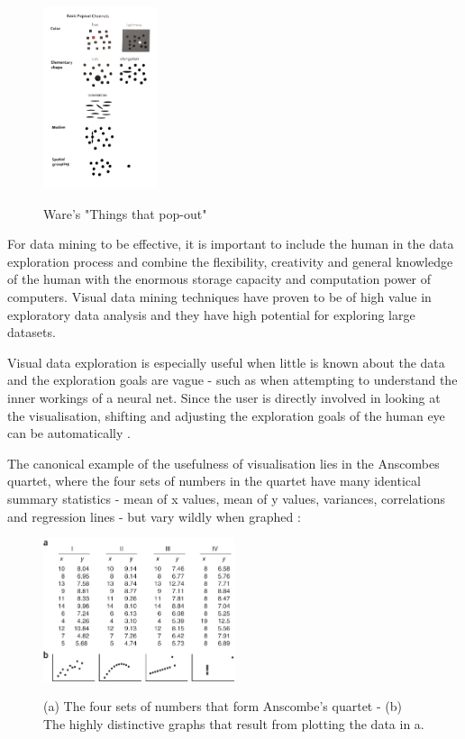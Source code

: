 \documentclass[a4paper,11pt,titlepage]{article}
\begin{document}
  		\begin{figure}[H]
    			\centering	
			{{\includegraphics[width=0.3\textwidth]
    				{img/ware_popout_channels.png} 
    			}}%
    			\caption{Ware's "Things that pop-out"}%
    		\label{fig:Ware Pop-Out}
		\end{figure}
  		 		
		\par 
		For data mining to be effective, it is important to include the human in the data exploration process and combine the flexibility, creativity and general knowledge of the human with the enormous storage capacity and computation power of computers. Visual data mining techniques have proven to be of high value in exploratory data analysis and they have high potential for exploring large datasets.
		\par 
		Visual data exploration is especially useful when little is known about the data and the exploration goals are vague - such as when attempting to understand the inner workings of a neural net. Since the user is directly involved in looking at the visualisation, shifting and adjusting the exploration goals of the human eye can be automatically \cite{Keim2002}.
		\par 
		The canonical example of the usefulness of visualisation lies in the Anscombes quartet, where the four sets of numbers in the quartet have many identical summary statistics - mean of x values, mean of y values, variances, correlations and regression lines - but vary wildly when graphed \cite{Shoresh2011}:

		\begin{figure}[H]
    			\centering	
				{{\includegraphics[width=0.5\textwidth]
    				{img/anscombes_quartet} 
    			}}%
    			\caption{(a) The four sets of numbers that form Anscombe's quartet -  (b) The highly distinctive graphs that result from plotting the data in a.}%
		\end{figure}
\end{document}
